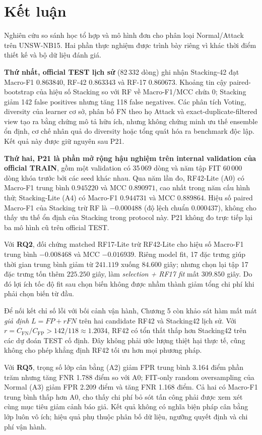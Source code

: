 \section{Kết luận}
\label{chap:ket-luan}
Nghiên cứu so sánh học tổ hợp và mô hình đơn cho phân loại Normal/Attack trên UNSW-NB15. Hai phần thực nghiệm được trình bày riêng vì khác thời điểm thiết kế và bộ dữ liệu đánh giá.

\textbf{Thứ nhất, official TEST lịch sử} (82\,332 dòng) ghi nhận Stacking-42 đạt Macro-F1 $0.863840$, RF-42 $0.863343$ và RF-17 $0.860673$. Khoảng tin cậy paired-bootstrap của hiệu số Stacking so với RF về Macro-F1/MCC chứa 0; Stacking giảm 142 false positives nhưng tăng 118 false negatives. Các phân tích Voting, diversity của learner cơ sở, phân bố FN theo họ Attack và exact-duplicate-filtered view tạo ra bằng chứng mô tả hữu ích, nhưng không chứng minh ưu thế ensemble ổn định, cơ chế nhân quả do diversity hoặc tổng quát hóa ra benchmark độc lập. Kết quả này được giữ nguyên sau P21.

\textbf{Thứ hai, P21 là phần mở rộng hậu nghiệm trên internal validation của official TRAIN}, gồm một validation có 35\,069 dòng và năm tập FIT 60\,000 dòng khóa trước bởi các seed khác nhau. Qua năm lần đo, RF42-Lite (A0) có Macro-F1 trung bình $0.945220$ và MCC $0.890971$, cao nhất trong năm cấu hình thử; Stacking-Lite (A4) có Macro-F1 $0.944731$ và MCC $0.889864$. Hiệu số paired Macro-F1 của Stacking trừ RF là $-0.000488$ (độ lệch chuẩn $0.000437$), không cho thấy ưu thế ổn định của Stacking trong protocol này. P21 không đo trực tiếp lại ba mô hình cũ trên official TEST.

Với \textbf{RQ2}, đối chứng matched RF17-Lite trừ RF42-Lite cho hiệu số Macro-F1 trung bình $-0.008468$ và MCC $-0.016939$. Riêng model fit, 17 đặc trưng giúp thời gian trung bình giảm từ $241.119$ xuống $84.600$ giây; nhưng chọn lại tập 17 đặc trưng tốn thêm $225.250$ giây, làm \emph{selection + RF17 fit} mất $309.850$ giây. Do đó lợi ích tốc độ fit sau chọn biến không được nhầm thành giảm tổng chi phí khi phải chọn biến từ đầu.

Để nối kết chỉ số lỗi với bối cảnh vận hành, Chương 5 còn khảo sát hàm mất mát \emph{giả định} $L=FP+rFN$ trên hai candidate RF42 và Stacking42 lịch sử. Với $r=C_{\mathrm{FN}}/C_{\mathrm{FP}}>142/118\approx1.2034$, RF42 có tổn thất thấp hơn Stacking42 trên các dự đoán TEST cố định. Đây không phải ước lượng thiệt hại thực tế, cũng không cho phép khẳng định RF42 tối ưu hơn mọi phương pháp.

Với \textbf{RQ5}, trọng số lớp cân bằng (A2) giảm FPR trung bình 3.164 điểm phần trăm nhưng tăng FNR 1.788 điểm so với A0; FIT-only random oversampling của Normal (A3) giảm FPR 2.209 điểm và tăng FNR 1.168 điểm. Cả hai có Macro-F1 trung bình thấp hơn A0, cho thấy chi phí bỏ sót tấn công phải được xem xét cùng mục tiêu giảm cảnh báo giả. Kết quả không có nghĩa biện pháp cân bằng lớp luôn vô ích; hiệu quả phụ thuộc phân bố dữ liệu, ngưỡng quyết định và chi phí vận hành.

